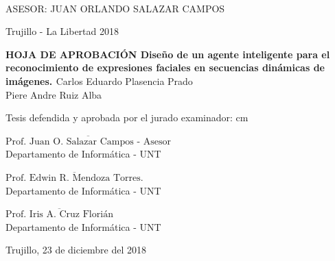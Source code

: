 \begin{center}
   {\bf {\fontsize{14}{16.8}\selectfont{CARLOS EDUARDO PLASENCIA PRADO}}}\\    
      {\bf {\fontsize{14}{16.8}\selectfont{PIERE ANDRE ALBA RUIZ}}}       
   \end{center}   

\vskip 2.5cm
\begin{center}
   {\bf \doublespacing {\fontsize{17}{20.4}\selectfont{DISEÑO DE UN AGENTE INTELIGENTE PARA EL RECONOCIMIENTO DE EXPRESIONES FACIALES EN SECUENCIAS DINÁMICAS DE IMÁGENES }}}     
\end{center}   
  \vskip 2cm
\begin{verse}
 \fontsize{12}{14.4}
\end{verse}

\vskip 1.5cm 
{\fontsize{14}{16.8}\selectfont ASESOR: JUAN ORLANDO SALAZAR CAMPOS} 
 \vskip 1cm 
 \begin{center}    
 \vskip 2cm
{\fontsize{14}{16.8}\selectfont Trujillo - La Libertad
\vskip 0.2cm
\hspace*{-0.2cm} 
2018}
\end{center} 
\newpage


\begin{center}
 {\bf {\Large HOJA DE APROBACIÓN }     
 \vskip 1cm
  {\Large Diseño de un agente inteligente para el reconocimiento de expresiones faciales en secuencias dinámicas de imágenes. }}
 \vskip 1cm 
  {\large{Carlos Eduardo Plasencia Prado}}\\
    {\large{Piere Andre Ruiz Alba}}

 \vskip 1cm
\end{center} 
Tesis defendida y aprobada por el jurado examinador:
 cm
\begin{flushleft} 
$\overline{\mbox{Prof. Juan O. Salazar Campos - Asesor}}$\\
\vskip -0.5cm
Departamento de Informática - UNT
\end{flushleft} 
\vskip 1cm
\begin{flushleft} 
$\overline{\mbox{Prof. Edwin R. Mendoza Torres.}}$\\
\vskip -0.5cm
Departamento de Informática - UNT
\end{flushleft} 
\vskip 1cm
\begin{flushleft} 
$\overline{\mbox{Prof. Iris A. Cruz Florián}}$\\
\vskip -0.5cm
Departamento de Informática - UNT
\end{flushleft}
\vskip 0.8cm 
\begin{center}    
Trujillo, 23 de diciembre del 2018
\end{center} 
\newpage



